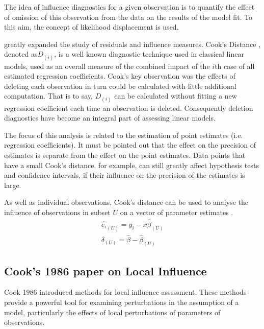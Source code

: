 \documentclass[Main.tex]{subfiles}
\begin{document}
	The idea of influence diagnostics for a given observation is to quantify the effect of omission of this observation 
	from the data on the results of the model fit. To this aim, the concept of likelihood displacement is used. 
	
	

\citet{cook77} greatly expanded the study of residuals and influence measures. Cook's Distance , denoted as$D_{(i)}$, is a well known diagnostic technique used in classical linear models, used as an overall measure of the combined impact of the $i$th case of all estimated regression coefficients. Cook's key observation was the effects of deleting each observation in turn could be calculated with little additional computation. That is to say, $D_{(i)}$ can be calculated without fitting a new regression coefficient each time an observation is deleted.  Consequently deletion diagnostics have become an integral part of assessing linear models. 


The focus of this analysis is related to the estimation of point estimates (i.e. regression coefficients). It must be pointed out that the effect on the precision of estimates is separate from the effect on the point estimates. Data points that
have a small Cook's distance, for example, can still greatly affect hypothesis tests and confidence intervals, if their  influence on the precision of the estimates is large.

As well as individual observations, Cook's distance can be used to analyse the influence of observations in subset $U$ on a vector of parameter estimates \citep{cook77}.
\begin{eqnarray}
\hat{e_{i}}_{(U)} = y_{i} - x\hat{\beta}_{(U)}\\
\delta_{(U)} = \hat{\beta} - \hat{\beta}_{(U)}
\end{eqnarray}


\subsection{Cook's 1986 paper on Local Influence}%
Cook 1986 introduced methods for local influence assessment. These methods provide a powerful tool for examining perturbations in the assumption of a model, particularly the effects of local perturbations of parameters of observations.
\end{document}
